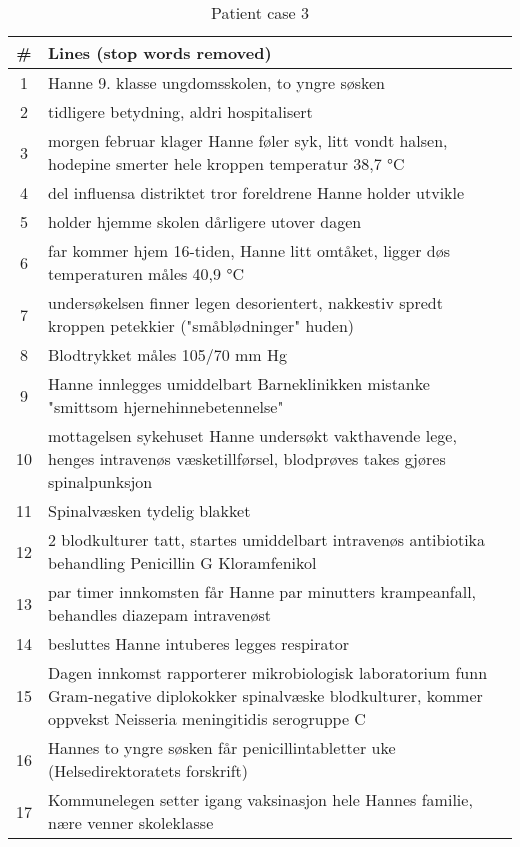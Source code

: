 \begin{table}[htbp] \footnotesize \center
\caption{Patient case 3\label{tab:pcase3}}
\begin{tabularx}{\textwidth}{c X}
    \toprule
    \# & Lines (stop words removed) \\
    \midrule
	1 & Hanne 9. klasse ungdomsskolen, to yngre søsken \\
	2 & tidligere betydning, aldri hospitalisert \\
	3 & morgen februar klager Hanne føler syk, litt vondt halsen, hodepine smerter hele kroppen temperatur 38,7 °C \\
	4 & del influensa distriktet tror foreldrene Hanne holder utvikle \\
	5 & holder hjemme skolen dårligere utover dagen \\
	6 & far kommer hjem 16-tiden, Hanne litt omtåket, ligger døs temperaturen måles 40,9 °C \\
	7 & undersøkelsen finner legen desorientert, nakkestiv spredt kroppen petekkier ("småblødninger" huden) \\
	8 & Blodtrykket måles 105/70 mm Hg \\
	9 & Hanne innlegges umiddelbart Barneklinikken mistanke "smittsom hjernehinnebetennelse" \\
	10 & mottagelsen sykehuset Hanne undersøkt vakthavende lege, henges intravenøs væsketillførsel, blodprøves takes gjøres spinalpunksjon \\
	11 & Spinalvæsken tydelig blakket \\
	12 & 2 blodkulturer tatt, startes umiddelbart intravenøs antibiotika behandling Penicillin G Kloramfenikol \\
	13 & par timer innkomsten får Hanne par minutters krampeanfall, behandles diazepam intravenøst \\
	14 & besluttes Hanne intuberes legges respirator \\
	15 & Dagen innkomst rapporterer mikrobiologisk laboratorium funn Gram-negative diplokokker spinalvæske blodkulturer, kommer oppvekst Neisseria meningitidis serogruppe C \\
	16 & Hannes to yngre søsken får penicillintabletter uke (Helsedirektoratets forskrift) \\
	17 & Kommunelegen setter igang vaksinasjon hele Hannes familie, nære venner skoleklasse \\
	\bottomrule
\end{tabularx}
\end{table}


